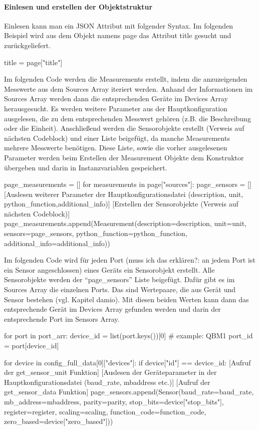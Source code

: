 \paragraph{Einlesen und erstellen der Objektstruktur}
Einlesen kann man ein JSON Attribut mit folgender Syntax. Im folgenden Beispiel wird aus dem Objekt namens page das Attribut title gesucht und zurückgeliefert.
\begin{pythoncode}
title = page["title"]
\end{pythoncode}

Im folgenden Code werden die Measurements erstellt, indem die anzuzeigenden Messwerte aus dem Sources Array iteriert werden. Anhand der Informationen im Sources Array werden dann die entsprechenden Geräte im Devices Array herausgesucht. Es werden weitere Parameter aus der Hauptkonfiguration ausgelesen, die zu dem entsprechenden Messwert gehören (z.B. die Beschreibung oder die Einheit). Anschließend werden die Sensorobjekte erstellt (Verweis auf nächsten Codeblock) und einer Liste beigefügt, da manche Measurements mehrere Messwerte benötigen. Diese Liste, sowie die vorher ausgelesenen Parameter werden beim Erstellen der Measurement Objekte dem Konstruktor übergeben und darin in Instanzvariablen gespeichert.
\begin{pythoncode}
page_measurements = []
for measurements in page["sources"]:
	page_sensors = []
	[Auslesen weiterer Parameter der Hauptkonfigurationsdatei (description, unit, python_function,additional_info)]
	[Erstellen der Sensorobjekte (Verweis auf nächsten Codeblock)]
	page_measurements.append(Measurement(description=description, unit=unit, sensors=page_sensors, python_function=python_function, additional_info=additional_info))
\end{pythoncode}

Im folgenden Code wird für jeden Port (muss ich das erklären?: an jedem Port ist ein Sensor angeschlossen) eines Geräts ein Sensorobjekt erstellt. Alle Sensorobjekte werden der \enquote{page\_sensors} Liste beigefügt. Dafür gibt es im Sources Array die einzelnen Ports. Das sind Wertepaare, die aus Gerät und Sensor bestehen (vgl. Kapitel damio). Mit diesen beiden Werten kann dann das entsprechende Gerät im Devices Array gefunden werden und darin der entsprechende Port im Sensors Array.
\begin{pythoncode}
for port in port_arr:
	device_id = list(port.keys())[0]  # example: QBM1
	port_id = port[device_id]
	
	for device in config_full_data[0]["devices"]:
		if device["id"] == device_id:
			[Aufruf der get\_sensor\_unit Funktion]
			[Auslesen der Geräteparameter in der Hauptkonfigurationsdatei (baud_rate, mbaddress etc.)]
			[Aufruf der get\_sensor\_data Funktion]
			page_sensors.append(Sensor(baud_rate=baud_rate, mb_address=mbaddress, parity=parity, stop_bits=device["stop_bits"], register=register, scaling=scaling, function_code=function_code, zero_based=device["zero_based"]))	
\end{pythoncode}

